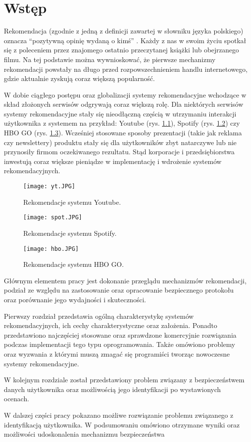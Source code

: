 
\chapter{Wstęp}

Rekomendacja (zgodnie z jedną z definicji zawartej w słowniku języka polskiego) oznacza “pozytywną opinię wydaną o kimś” \cite{pwn}. Każdy z nas w swoim życiu spotkał się z poleceniem przez znajomego ostatnio przeczytanej książki lub obejrzanego filmu. Na tej podstawie można wywnioskować, że pierwsze mechanizmy rekomendacji powstały na długo przed rozpowszechnieniem handlu internetowego, gdzie aktualnie zyskują coraz większą popularność.

W dobie ciągłego postępu oraz globalizacji systemy rekomendacyjne wchodzące w skład złożonych serwisów odgrywają coraz większą rolę. Dla niektórych serwisów systemy rekomendacyjne stały się nieodłączną częścią w utrzymaniu interakcji użytkownika z systemem na przykład: Youtube (rys. \ref{fig:yt}), Spotify (rys. \ref{fig:spotify}) czy HBO GO (rys. \ref{fig:hbo}). Wcześniej stosowane sposoby prezentacji (takie jak reklama czy newslettery) produktu stały się dla użytkowników zbyt natarczywe lub nie przynosiły firmom oczekiwanego rezultatu. Stąd korporacje i przedsiębiorstwa inwestują coraz większe pieniądze w implementację i wdrożenie systemów rekomendacyjnych.

\begin{figure}
    \centering
    \texttt{[image: yt.JPG]}
    \caption{Rekomendacje systemu Youtube.}
    \label{fig:yt}
\end{figure}

\begin{figure}
    \centering
    \texttt{[image: spot.JPG]}
    \caption{Rekomendacje systemu Spotify.}
    \label{fig:spotify}
\end{figure}

\begin{figure}
    \texttt{[image: hbo.JPG]}
    \caption{Rekomendacje systemu HBO GO.}
    \label{fig:hbo}
\end{figure}

\indent Głównym elementem pracy jest dokonanie przeglądu mechanizmów rekomendacji, podział ze względu na zastosowanie oraz opracowanie bezpiecznego protokołu oraz porównanie jego wydajności i skuteczności.

\indent Pierwszy rozdział przedstawia ogólną charakterystykę systemów rekomendacyjnych, ich cechy charakterystyczne oraz założenia. Ponadto przedstawiono najczęściej stosowane oraz sprawdzone komercyjnie rozwiązania podczas implementacji tego typu oprogramowania. Także omówiono problemy oraz wyzwania z którymi muszą zmagać się programiści tworząc nowoczesne systemy rekomendacyjne.  

\indent W kolejnym rozdziale został przedstawiony problem związany z bezpieczeństwem danych użytkownika oraz możliwością jego identyfikacji po wystawionych ocenach.

\indent W dalszej części pracy pokazano możliwe rozwiązanie problemu związanego z identyfikacją użytkownika.
W podsumowaniu omówiono otrzymane wyniki oraz możliwości udoskonalenia mechanizmu bezpieczeństwa 
